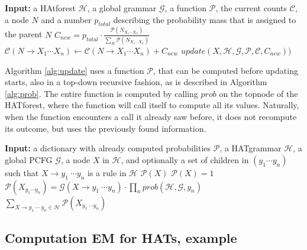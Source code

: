 \documentclass{article}
\newcommand{\G}{\mathcal{G}}
\newcommand{\Hg}{\mathcal{H}}
\newcommand{\C}{\mathcal{C}}
\newcommand{\Pp}{\mathcal{P}}
\begin{document}
\begin{algorithm}
\caption{$update(N,\Hg,\G,\Pp,\C,p_{total})$}\label{alg:update}
\begin{algorithmic}
\STATE \textbf{Input:} a HAtforest $\Hg$, a global grammar $\G$, a function $\Pp$, the current counts $\C$, a node $N$ and a number $p_{total}$ describing the probability mass that is assigned to the parent $N$
\STATE
\IF{$\neg \exists N\rightarrow X_1~\cdots X_n\in\Hg$}
	\RETURN
\ENDIF
\FOR{$R = N\rightarrow X_1~\cdots X_n\in\Hg$}
	\STATE $C_{new} = p_{total}\cdot\frac{\Pp(N_{X_1\cdots X_n})}{\sum_{R} \Pp(N_{X_1\cdots X_n})}$
	\STATE $\C(N\rightarrow X_1\cdots X_n) \leftarrow \C(N\rightarrow X_1\cdots X_n) + C_{new}  $
		\STATE $update(X,\Hg,\G,\Pp,\C,C_{new}))$
	\ENDFOR
\ENDFOR
\end{algorithmic}
\end{algorithm}

Algorithm \ref{alg:update} uses  a function $\Pp$, that can be computed before updating starts, also in a top-down recursive fashion, as is described in Algorithm \ref{alg:prob}. The entire function is computed by calling $prob$ on the topnode of the HATforest, where the function will call itself to compute all its values. Naturally, when the function encounters a call it already saw before, it does not recompute its outcome, but uses the previously found information.

\begin{algorithm}[!ht]
\caption{$prob(\Pp, \Hg,\G,X,(y_1,\cdots,y_n) = None$)}\label{alg:prob}
\begin{algorithmic}
\STATE \textbf{Input:} a dictionary with already computed probabilities $\Pp$, a HATgrammar $\Hg$, a global PCFG $\G$, a node $X$ in $\Hg$, and optionally a set of children in $(y_1\cdots y_n)$ such that $X\rightarrow y_1~\cdots y_n$ is a rule in $\Hg$
\STATE
\IF{$X \in \Pp$}
	\RETURN $\Pp(X)$
	\STATE
\ELSIF{$\neg\exists X\rightarrow C_1~\cdots ~C_N \in\Hg$}
	\RETURN $\Pp(X)=1$
	\STATE
{}
	\RETURN $\Pp(X_{y_1\cdots y_n}) = \G(X\rightarrow y_1~\cdots y_n)\cdot\prod_{n}prob(\Hg,\G,y_n)$
	\STATE
\ELSE
	\RETURN $\sum_{X\rightarrow y_1~\cdots ~y_n \in\Hg} \Pp(X_{y_1~\cdots y_n})$
	\STATE
\ENDIF
\end{algorithmic}
\end{algorithm}

\subsection{Computation EM for HATs, example}
\end{document}
